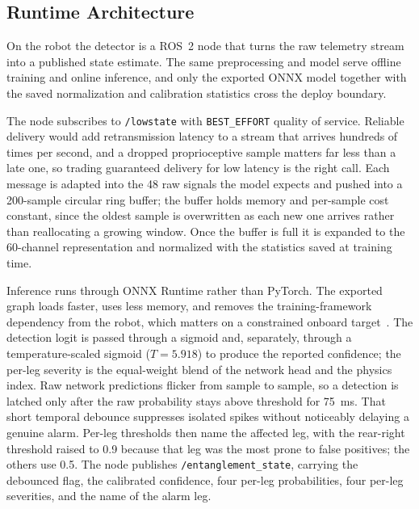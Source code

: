 \documentclass[conference]{IEEEtran}
\begin{document}
\subsection{Runtime Architecture}
\label{sec:runtime}

On the robot the detector is a ROS~2 node that turns the raw telemetry stream into a published
state estimate. The same preprocessing and model serve offline training and online inference, and only the exported ONNX model together with the saved normalization and calibration statistics cross the deploy boundary.

The node subscribes to \texttt{/lowstate} with \texttt{BEST\_EFFORT} quality of service. Reliable
delivery would add retransmission latency to a stream that arrives hundreds of times per second, and
a dropped proprioceptive sample matters far less than a late one, so trading guaranteed delivery for
low latency is the right call. Each message is adapted into the 48 raw signals the model expects and
pushed into a 200-sample circular ring buffer; the buffer holds memory and per-sample cost constant,
since the oldest sample is overwritten as each new one arrives rather than reallocating a growing
window. Once the buffer is full it is expanded to the 60-channel representation and normalized with
the statistics saved at training time.

Inference runs through ONNX Runtime rather than PyTorch. The exported graph loads faster, uses less
memory, and removes the training-framework dependency from the robot, which matters on a constrained
onboard target~\cite{onnxruntime,macenski2022ros2}. The detection logit is passed through a sigmoid
and, separately, through a temperature-scaled sigmoid ($T=5.918$) to produce the reported confidence;
the per-leg severity is the equal-weight blend of the network head and the physics index. Raw network
predictions flicker from sample to sample, so a detection is latched only after the raw probability
stays above threshold for 75~ms. That short temporal debounce suppresses isolated spikes without
noticeably delaying a genuine alarm. Per-leg thresholds then name the affected leg, with the
rear-right threshold raised to 0.9 because that leg was the most prone to false positives; the others
use 0.5. The node publishes
\texttt{/entanglement\_state}, carrying the debounced flag, the calibrated confidence, four per-leg
probabilities, four per-leg severities, and the name of the alarm leg.
\end{document}
